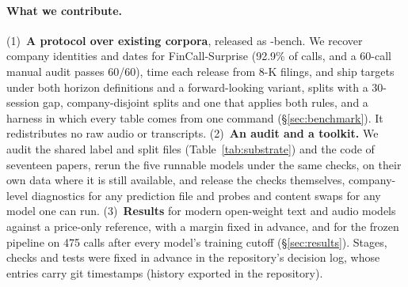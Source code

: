 \paragraph{What we contribute.}
(1)~\textbf{A protocol over existing corpora}, released as \ecvol-bench. We
recover company identities and dates for FinCall-Surprise (92.9\% of calls, and a
60-call manual audit passes 60/60), time each release from 8-K filings, and ship
targets under both horizon definitions and a forward-looking variant, splits with
a 30-session gap, company-disjoint splits and one that applies both rules, and a
harness in which every table comes from one command (\S\ref{sec:benchmark}). It
redistributes no raw audio or transcripts.
(2)~\textbf{An audit and a toolkit.} We audit the shared label and split files
(Table~\ref{tab:substrate}) and the code of seventeen papers, rerun the five
runnable models under the same checks, on their own data where it is still
available, and release the checks themselves, company-level diagnostics for any
prediction file and probes and content swaps for any model one can run.
(3)~\textbf{Results} for modern open-weight text and audio models against a
price-only reference, with a margin fixed in advance, and for the frozen
pipeline on 475 calls after every model's training cutoff
(\S\ref{sec:results}). Stages, checks and tests were fixed in advance in the
repository's decision log, whose entries carry git timestamps (history
exported in the repository).
